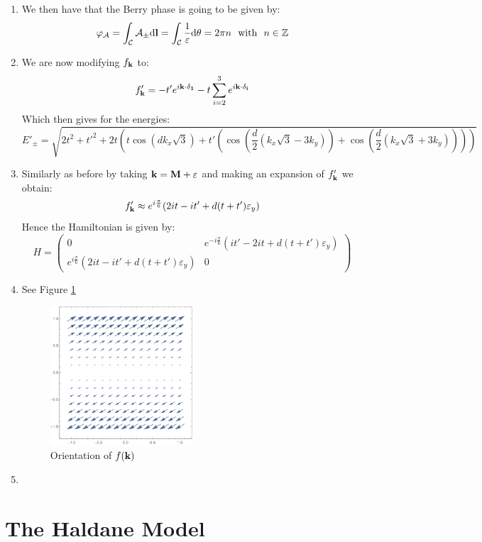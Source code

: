 \documentclass[10pt,a4paper]{article}
\begin{document}
\begin{enumerate}
\item We then have that the Berry phase is going to be given by:
\[
\varphi_\mathcal{A} = \int_\mathcal{C} \vb{\mathcal{A}_\pm} \dd \vb{l} = \int_\mathcal{C} \frac{1}{\varepsilon} \dd \theta = 2 \pi n \mbox{~~with~~} n \in \mathbb{Z}
\]

\item We are now modifying $f_{\vb{k}}$ to:
\[
f'_{\vb{k}} = - t' e^{i \vb{k} \cdot \vb{\delta_1}} - t \sum_{i = 2}^3 e^{i \vb{k} \cdot \vb{\delta_i}}
\]
Which then gives for the energies:
\[
E'_\pm = \sqrt{2t^2 + t'^2 + 2t \left( t \cos(d k_x \sqrt{3}) + t'\left( \cos(\frac{d}{2} (k_x \sqrt{3} - 3 k_y)) + \cos(\frac{d}{2}(k_x\sqrt{3} + 3 k_y)) \right) \right)}
\]

\item Similarly as before by taking $\vb{k} = \vb{M} + \vb{\varepsilon}$ and making an expansion of $f'_{\vb{k}}$ we obtain:
\[
f'_{\vb{k}} \approx e^{i\frac{\pi}{6}} (2 i t - i t' + d(t + t')\varepsilon_y)
\]
Hence the Hamiltonian is given by:
\[
H = \begin{pmatrix}
0 & e^{- i \frac{\pi}{6}} (i t' - 2 i t + d(t + t')\varepsilon_y)\\
e^{i\frac{\pi}{6}} (2 i t - i t' + d(t + t')\varepsilon_y) & 0 
\end{pmatrix}
\]

\item See Figure \ref{fkvfield} 
\begin{figure} 
\centering
\includegraphics[width=0.5\textwidth]{fkvfield}
\caption{Orientation of $f(\vb{k})$} \label{fkvfield}
\end{figure}

\item 

\end{enumerate}

\section{The Haldane Model}
\end{document}
